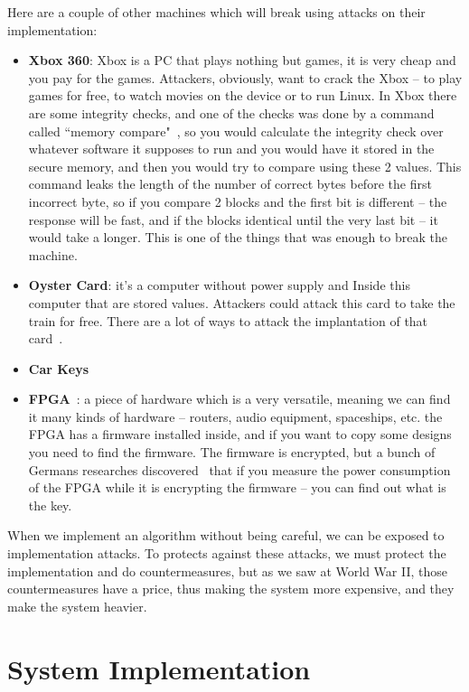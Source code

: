 Here are a couple of other machines which will break using attacks on their implementation:

\begin{itemize}
    \item \textbf{Xbox 360}: Xbox is a PC that plays nothing but games, it is very cheap and you pay for the games. Attackers, obviously, want to crack the Xbox – to play games for free, to watch movies on the device or to run Linux. In Xbox there are some integrity checks, and one of the checks was done by a command called ``memory compare"~\cite{memcmp}, so you would calculate the integrity check over whatever software it supposes to run and you would have it stored in the secure memory, and then you would try to compare using these 2 values. This command leaks the length of the number of correct bytes before the first incorrect byte, so if you compare 2 blocks and the first bit is different – the response will be fast, and if the blocks identical until the very last bit – it would take a longer. This is one of the things that was enough to break the machine. 
    \item \textbf{Oyster Card}: it's a computer without power supply and Inside this computer that are stored values. Attackers could attack this card to take the train for free. There are a lot of ways to attack the implantation of that card~\cite{garcia2008dismantling, courtois2008algebraic}.
    \item \textbf{Car Keys}~\cite{relayAttack}
    \item \textbf{FPGA}~\cite{fpga}: a piece of hardware which is a very versatile, meaning we can find it many kinds of hardware – routers, audio equipment, spaceships, etc. the FPGA has a firmware installed inside, and if you want to copy some designs you need to find the firmware. The firmware is encrypted, but a bunch of Germans researches discovered~\cite{moradi2011vulnerability} that if you measure the power consumption of the FPGA while it is encrypting the firmware – you can find out what is the key.
\end{itemize}

When we implement an algorithm without being careful, we can be exposed to implementation attacks. To protects against these attacks, we must protect the implementation and do countermeasures, but as we saw at World War II, those countermeasures have a price, thus making the system more expensive, and they make the system heavier.

\section{System Implementation} \label{sec:SystemImpl}

